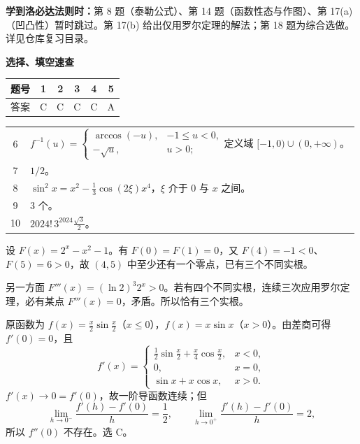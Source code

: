 

\begin{center}
\end{center}
\textbf{学到洛必达法则时：}第 8 题（泰勒公式）、第 14 题（函数性态与作图）、第 17(a)（凹凸性）暂时跳过。第 17(b) 给出仅用罗尔定理的解法；第 18 题为综合选做。详见仓库复习目录。

\textbf{选择、填空速查}
\begin{center}
\begin{tabular}{c*{5}{c}}
\toprule 题号 & 1 & 2 & 3 & 4 & 5\\\midrule
答案 & C & C & C & C & A\\\bottomrule
\end{tabular}
\end{center}
\begin{tabular}{@{}cl@{}}
6 & $f^{-1}(u)=\begin{cases}\arccos(-u),&-1\le u<0,\\-\sqrt u,&u>0;\end{cases}$\quad 定义域 $[-1,0)\cup(0,+\infty)$。\\[7pt]
7 & $1/2$。\\[4pt]
8 & $\sin^2x=x^2-\frac13\cos(2\xi)x^4$，$\xi$ 介于 $0$ 与 $x$ 之间。\\[4pt]
9 & $3$ 个。\\[4pt]
10 & $2024!\,3^{2024}\frac{\sqrt3}2$。\\
\end{tabular}

设 $F(x)=2^x-x^2-1$。有 $F(0)=F(1)=0$，又 $F(4)=-1<0$、$F(5)=6>0$，故 $(4,5)$ 中至少还有一个零点，已有三个不同实根。

另一方面 $F'''(x)=(\ln2)^3 2^x>0$。若有四个不同实根，连续三次应用罗尔定理，必有某点 $F'''(x)=0$，矛盾。所以恰有三个实根。

原函数为 $f(x)=\frac x2\sin\frac x2$（$x\le0$），$f(x)=x\sin x$（$x>0$）。由差商可得 $f'(0)=0$，且
\[
f'(x)=\begin{cases}\frac12\sin\frac x2+\frac x4\cos\frac x2,&x<0,\\0,&x=0,\\\sin x+x\cos x,&x>0.\end{cases}
\]
$f'(x)\to0=f'(0)$，故一阶导函数连续；但
\[
\lim_{h\to0^-}\frac{f'(h)-f'(0)}h=\frac12,\qquad
\lim_{h\to0^+}\frac{f'(h)-f'(0)}h=2,
\]
所以 $f''(0)$ 不存在。选 C。

